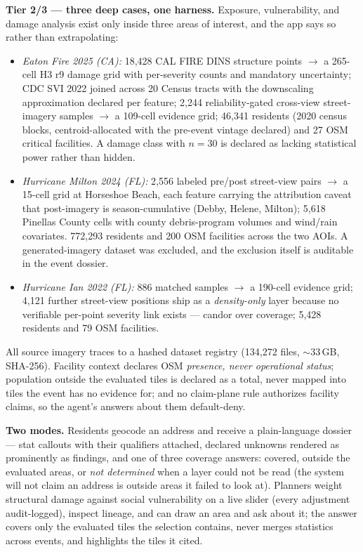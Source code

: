 \documentclass[sigconf,screen]{acmart}
\begin{document}
\textbf{Tier 2/3 --- three deep cases, one harness.} Exposure,
vulnerability, and damage analysis exist only inside three areas of
interest, and the app says so rather than extrapolating:
\begin{itemize}
\item \emph{Eaton Fire 2025 (CA):} 18{,}428 CAL FIRE DINS structure
  points $\rightarrow$ a 265-cell H3 r9 damage grid with per-severity
  counts and mandatory uncertainty; CDC SVI 2022 joined across 20 Census
  tracts with the downscaling approximation declared per feature;
  2{,}244 reliability-gated cross-view street-imagery samples
  $\rightarrow$ a 109-cell evidence grid; 46{,}341 residents (2020
  census blocks, centroid-allocated with the pre-event vintage declared)
  and 27 OSM critical facilities. A damage class with $n{=}30$
  is declared as lacking statistical power rather than hidden.
\item \emph{Hurricane Milton 2024 (FL):} 2{,}556 labeled pre/post
  street-view pairs $\rightarrow$ a 15-cell grid at Horseshoe Beach,
  each feature carrying the attribution caveat that post-imagery is
  season-cumulative (Debby, Helene, Milton); 5{,}618 Pinellas County
  cells with county debris-program volumes and wind/rain covariates.
  772{,}293 residents and 200 OSM facilities across the two AOIs. A
  generated-imagery dataset was excluded, and the exclusion itself is
  auditable in the event dossier.
\item \emph{Hurricane Ian 2022 (FL):} 886 matched samples $\rightarrow$
  a 190-cell evidence grid; 4{,}121 further street-view positions ship
  as a \emph{density-only} layer because no verifiable per-point
  severity link exists --- candor over coverage; 5{,}428 residents and
  79 OSM facilities.
\end{itemize}
All source imagery traces to a hashed dataset registry (134{,}272
files, $\sim$33\,GB, SHA-256). Facility context declares OSM
\emph{presence, never operational status}; population outside the
evaluated tiles is declared as a total, never mapped into tiles the
event has no evidence for; and no claim-plane rule authorizes facility
claims, so the agent's answers about them default-deny.

\textbf{Two modes.} Residents geocode an address and receive a
plain-language dossier --- stat callouts with their qualifiers attached,
declared unknowns rendered as prominently as findings, and one of three
coverage answers: covered, outside the evaluated areas, or
\emph{not determined} when a layer could not be read (the system will
not claim an address is outside areas it failed to look at). Planners
weight structural damage against social vulnerability on a live slider
(every adjustment audit-logged), inspect lineage, and can draw an area
and ask about it; the answer covers only the evaluated tiles the
selection contains, never merges statistics across events, and
highlights the tiles it cited.
\end{document}
